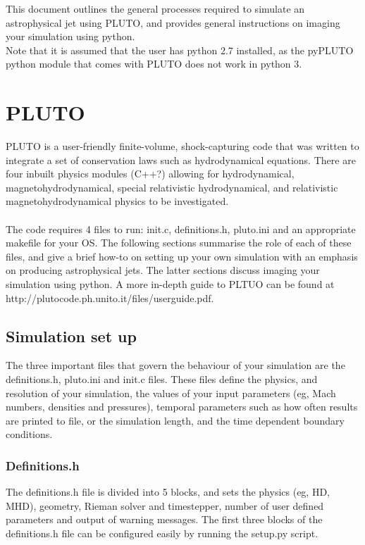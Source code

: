 \documentclass[12pt]{article}
\begin{document}
\maketitle

\noindent This document outlines the general processes required to simulate an astrophysical jet using PLUTO, and provides general instructions on imaging your simulation using python.\\
\newline
Note that it is assumed that the user has python 2.7 installed, as the pyPLUTO python module that comes with PLUTO does not work in python 3.
\section{PLUTO}

PLUTO is a user-friendly finite-volume, shock-capturing code that was written to integrate a set of conservation laws such as hydrodynamical equations. There are four inbuilt physics modules (C++?) allowing for hydrodynamical, magnetohydrodynamical, special relativistic hydrodynamical, and relativistic magnetohydrodynamical physics to be investigated.\\
\\
The code requires 4 files to run: init.c, definitions.h, pluto.ini and an appropriate makefile for your OS. The following sections summarise the role of each of these files, and give a brief how-to on setting up your own simulation with an emphasis on producing astrophysical jets. The latter sections discuss imaging your simulation using python. A more in-depth guide to PLTUO can be found at http://plutocode.ph.unito.it/files/userguide.pdf.

\subsection{Simulation set up}

The three important files that govern the behaviour of your simulation are the definitions.h, pluto.ini and init.c files. These files define the physics, and resolution of your simulation, the values of your input parameters (eg, Mach numbers, densities and pressures), temporal parameters such as how often results are printed to file, or the simulation length, and the time dependent boundary conditions.

\subsubsection{Definitions.h}
The definitions.h file is divided into 5 blocks, and sets the physics (eg, HD, MHD), geometry, Rieman solver and timestepper, number of user defined parameters and output of warning messages. The first three blocks of the definitions.h file can be configured easily by running the setup.py script.
\end{document}

